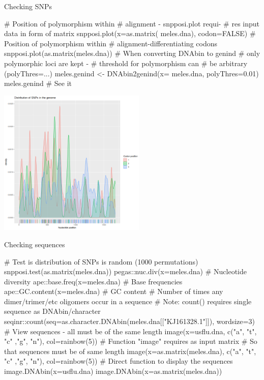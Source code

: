 \documentclass[compress, ucs, xelatex, 11pt, xcolor=svgnames, aspectratio=169,
	hyperref={
		bookmarks=true,
		unicode=true,
		colorlinks=true,
		pdftitle={Molecular data in R},
		plainpages=false,
		pdfauthor={Vojtech Zeisek},
		pdfsubject={Course about phylogeny and evolution in R},
		pdfcreator={XeLaTeX},
		pdfkeywords={R, evolution, phylogeny, molecular data},
		linkcolor=Crimson, %
		anchorcolor=Magenta, %
		citecolor=Magenta, %
		filecolor=Magenta, %
		menucolor=Magenta, %
		urlcolor=DodgerBlue, %
		pdftex},
	url={hyphens, lowtilde} %
	]{beamer}
\begin{document}
\begin{frame}[fragile]{Checking SNPs}
	\begin{multicols}{2}
		\begin{spluscode}
    # Position of polymorphism within
    # alignment - snpposi.plot requi-
    # res input data in form of matrix
    snpposi.plot(x=as.matrix(
      meles.dna), codon=FALSE)
    # Position of polymorphism within
    # alignment-differentiating codons
    snpposi.plot(as.matrix(meles.dna))
    # When converting DNAbin to genind
    # only polymorphic loci are kept -
    # threshold for polymorphism can
    # be arbitrary (polyThres=...)
    meles.genind <- DNAbin2genind(x=
      meles.dna, polyThres=0.01)
    meles.genind # See it
		\end{spluscode}
		\begin{flushright}
			\includegraphics[height=7cm]{snpposi.png}
		\end{flushright}
	\end{multicols}
\end{frame}

\begin{frame}[fragile]{Checking sequences}
	\begin{spluscode}
    # Test is distribution of SNPs is random (1000 permutations)
    snpposi.test(as.matrix(meles.dna))
    pegas::nuc.div(x=meles.dna) # Nucleotide diversity
    ape::base.freq(x=meles.dna) # Base frequencies
    ape::GC.content(x=meles.dna) # GC content
    # Number of times any dimer/trimer/etc oligomers occur in a sequence
    # Note: count() requires single sequence as DNAbin/character
    seqinr::count(seq=as.character.DNAbin(meles.dna[["KJ161328.1"]]),
      wordsize=3)
    # View sequences - all must be of the same length
    image(x=usflu.dna, c("a", "t", "c" ,"g", "n"), col=rainbow(5))
    # Function "image" requires as input matrix
    # So that sequences must be of same length
    image(x=as.matrix(meles.dna), c("a", "t", "c" ,"g", "n"), col=rainbow(5))
    # Direct function to display the sequences
    image.DNAbin(x=usflu.dna)
    image.DNAbin(x=as.matrix(meles.dna))
	\end{spluscode}
\end{frame}
\end{document}
